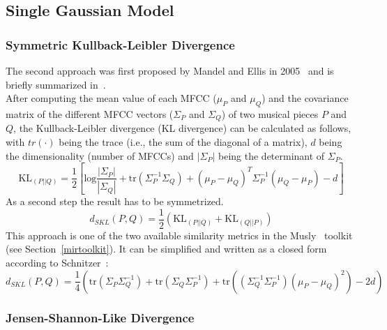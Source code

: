 \subsection{Single Gaussian Model}

\subsubsection{Symmetric Kullback-Leibler Divergence}\label{klth}

The second approach was first proposed by Mandel and Ellis in 2005~\cite{mandelellis1} and is briefly summarized in~\cite[pp. 65f]{knees1}.\\
After computing the mean value of each MFCC ($\mu_P$ and $\mu_Q$) and the covariance matrix of the different MFCC vectors ($\Sigma_P$ and $\Sigma_Q$) of two musical pieces $P$ and $Q$, the Kullback-Leibler divergence (KL divergence) can be calculated as follows, with $tr(\cdot)$ being the trace (i.e., the sum of the diagonal of a matrix), $d$ being the dimensionality (number of MFCCs) and $|\Sigma_P|$ being the determinant of $\Sigma_P$.\\
\begin{equation} \label{eq:KL1}
\text{KL}_{(P||Q)} = \frac{1}{2}[\text{log}\frac{|\Sigma_P|}{|\Sigma_Q|} + \text{tr}(\Sigma_P^{-1}\Sigma_Q) + (\mu_P - \mu_Q)^T \Sigma_P^{-1} (\mu_Q - \mu_P) - d]
\end{equation}
As a second step the result has to be symmetrized.
\begin{equation} \label{eq:KL2}
d_{SKL}(P, Q) = \frac{1}{2} (\text{KL}_{(P||Q)} + \text{KL}_{(Q||P)}) 
\end{equation}
This approach is one of the two available similarity metrics in the Musly~\cite{musly1} toolkit (see Section~\ref{mirtoolkit}). It can be simplified and written as a closed form according to Schnitzer~\cite[p. 44]{schnitzer1}:
\begin{equation} \label{eq:SKL}
d_{SKL}(P, Q) = \frac{1}{4} (\text{tr}(\Sigma_P\Sigma_Q^{-1}) + \text{tr}(\Sigma_Q\Sigma_P^{-1}) + \text{tr}((\Sigma_Q^{-1}\Sigma_P^{-1})(\mu_P - \mu_Q)^2) - 2d)
\end{equation}

\subsubsection{Jensen-Shannon-Like Divergence}

